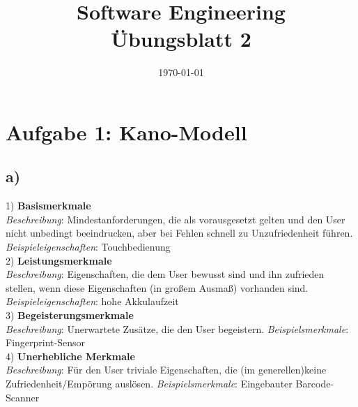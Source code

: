 \documentclass[12pt,pdftex,a4paper]{article}
\title{\vspace{-1cm} Software Engineering \\ Übungsblatt 2}
\date{\today}
\begin{document}
\setlength{\parindent}{0pt}
\maketitle
\thispagestyle{fancy}




\section*{Aufgabe 1: Kano-Modell}

\subsection*{a) }
1) \textbf{Basismerkmale} \\
\textit{Beschreibung}: Mindestanforderungen, die als vorausgesetzt gelten und den User nicht unbedingt beeindrucken, aber bei Fehlen schnell zu Unzufriedenheit führen.\newline
\textit{Beispieleigenschaften}: Touchbedienung\\

2) \textbf{Leistungsmerkmale}\\
\textit{Beschreibung}: Eigenschaften, die dem User bewusst sind und ihn zufrieden stellen, wenn diese Eigenschaften (in großem Ausmaß) vorhanden sind. \newline
\textit{Beispieleigenschaften}: hohe Akkulaufzeit\\

3) \textbf{Begeisterungsmerkmale}\\
\textit{Beschreibung}: Unerwartete Zusätze, die den User begeistern.\newline
\textit{Beispielsmerkmale}: Fingerprint-Sensor\\

4) \textbf{Unerhebliche Merkmale}\\
\textit{Beschreibung}: Für den User triviale Eigenschaften, die (im generellen)keine Zufriedenheit/Empörung auslösen.\newline
\textit{Beispielsmerkmale}: Eingebauter Barcode-Scanner\\
\end{document}

